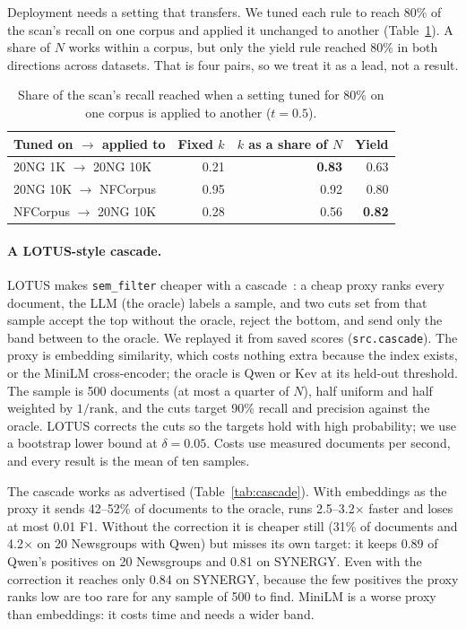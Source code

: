 \documentclass[11pt]{article}
\begin{document}
Deployment needs a setting that transfers. We tuned each rule to reach 80\% of
the scan's recall on one corpus and applied it unchanged to another
(Table~\ref{tab:transfer}). A share of $N$ works within a corpus, but only the
yield rule reached 80\% in both directions across datasets. That is four pairs,
so we treat it as a lead, not a result.

\begin{table}[t]
\centering
\small
\begin{tabular}{@{}lrrr@{}}
\toprule
Tuned on $\rightarrow$ applied to & Fixed $k$ & $k$ as a share of $N$ & Yield \\
\midrule
20NG 1K $\rightarrow$ 20NG 10K & 0.21 & \textbf{0.83} & 0.63 \\
20NG 10K $\rightarrow$ NFCorpus & 0.95 & 0.92 & 0.80 \\
NFCorpus $\rightarrow$ 20NG 10K & 0.28 & 0.56 & \textbf{0.82} \\
\bottomrule
\end{tabular}
\caption{Share of the scan's recall reached when a setting tuned for 80\% on
one corpus is applied to another ($t=0.5$).}
\label{tab:transfer}
\end{table}

\paragraph{A LOTUS-style cascade.}
LOTUS makes \texttt{sem\_filter} cheaper with a cascade~\cite{patel2024lotus}:
a cheap proxy ranks every document, the LLM (the oracle) labels a sample, and
two cuts set from that sample accept the top without the oracle, reject the
bottom, and send only the band between to the oracle. We replayed it from saved
scores (\texttt{src.cascade}). The proxy is embedding similarity, which costs
nothing extra because the index exists, or the MiniLM cross-encoder; the oracle
is Qwen or Kev at its held-out threshold. The sample is 500 documents (at most a
quarter of $N$), half uniform and half weighted by $1/\text{rank}$, and the cuts
target 90\% recall and precision against the oracle. LOTUS corrects the cuts so
the targets hold with high probability; we use a bootstrap lower bound at
$\delta = 0.05$. Costs use measured documents per second, and every result is
the mean of ten samples.

The cascade works as advertised (Table~\ref{tab:cascade}). With embeddings as
the proxy it sends 42--52\% of documents to the oracle, runs 2.5--3.2$\times$
faster and loses at most 0.01 F1. Without the correction it is cheaper still
(31\% of documents and 4.2$\times$ on 20 Newsgroups with Qwen) but misses its
own target: it keeps 0.89 of Qwen's positives on 20 Newsgroups and 0.81 on
SYNERGY. Even with the correction it reaches only 0.84 on SYNERGY, because the
few positives the proxy ranks low are too rare for any sample of 500 to find.
MiniLM is a worse proxy than embeddings: it costs time and needs a wider band.
\end{document}
